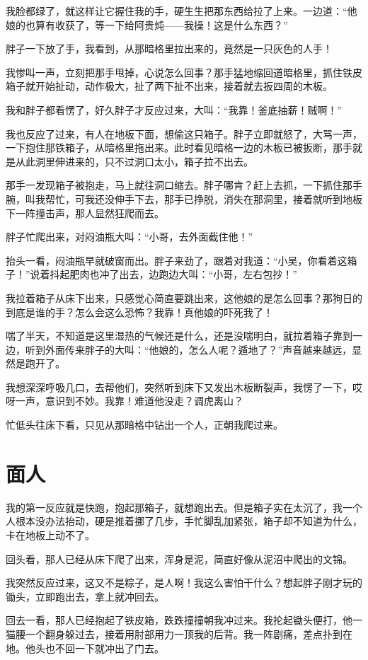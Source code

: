 我脸都绿了，就这样让它握住我的手，硬生生把那东西给拉了上来。一边道：“他娘的也算有收获了，等一下给阿贵炖——我操！这是什么东西？”

胖子一下放了手，我看到，从那暗格里拉出来的，竟然是一只灰色的人手！

我惨叫一声，立刻把那手甩掉，心说怎么回事？那手猛地缩回道暗格里，抓住铁皮箱子就开始扯动，动作极大，扯了两下扯不出来，接着就去扳四周的木板。

我和胖子都看愣了，好久胖子才反应过来，大叫：“我靠！釜底抽薪！贼啊！”

我也反应了过来，有人在地板下面，想偷这只箱子。胖子立即就怒了，大骂一声，一下抱住那铁箱子，从暗格里拖出来。此时看见暗格一边的木板已被扳断，那手就是从此洞里伸进来的，只不过洞口太小，箱子拉不出去。

那手一发现箱子被抱走，马上就往洞口缩去。胖子哪肯？赶上去抓，一下抓住那手腕，叫我帮忙，可我还没伸手下去，那手已挣脱，消失在那洞里，接着就听到地板下一阵撞击声，那人显然狂爬而去。

胖子忙爬出来，对闷油瓶大叫：“小哥，去外面截住他！”

抬头一看，闷油瓶早就破窗而出。胖子来劲了，跟着对我道：“小吴，你看着这箱子！”说着抖起肥肉也冲了出去，边跑边大叫：“小哥，左右包抄！”

我拉着箱子从床下出来，只感觉心简直要跳出来，这他娘的是怎么回事？那狗日的到底是谁的手？怎么会这么恐怖？我靠！真他娘的吓死我了！

喘了半天，不知道是这里湿热的气候还是什么，还是没喘明白，就拉着箱子靠到一边，听到外面传来胖子的大叫：“他娘的，怎么人呢？遁地了？”声音越来越远，显然是跑开了。

我想深深呼吸几口，去帮他们，突然听到床下又发出木板断裂声，我愣了一下，哎呀一声，意识到不妙。我靠！难道他没走？调虎离山？

忙低头往床下看，只见从那暗格中钻出一个人，正朝我爬过来。

\chapter{面人}

我的第一反应就是快跑，抱起那箱子，就想跑出去。但是箱子实在太沉了，我一个人根本没办法抬动，硬是推着挪了几步，手忙脚乱加紧张，箱子却不知道为什么，卡在地板上动不了。

回头看，那人已经从床下爬了出来，浑身是泥，简直好像从泥沼中爬出的文锦。

我突然反应过来，这又不是粽子，是人啊！我这么害怕干什么？想起胖子刚才玩的锄头，立即跑出去，拿上就冲回去。

回去一看，那人已经抱起了铁皮箱，跌跌撞撞朝我冲过来。我抡起锄头便打，他一猫腰一个翻身躲过去，接着用肘部用力一顶我的后背。我一阵剧痛，差点扑到在地。他头也不回一下就冲出了门去。

